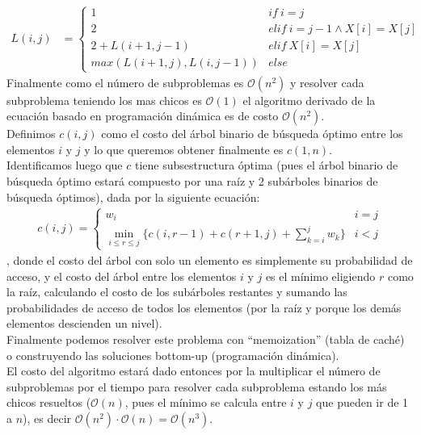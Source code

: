 \documentclass[dcc,uchile]{fcfmcourse}
\begin{document}
\begin{problems}
\begin{align*}
    L(i,j) &= 
    \begin{cases} 
      1 & if\ i = j \\
      2 & elif\ i = j-1 \land X[i]=X[j]\\
      2+L(i+1,j-1) & elif\ X[i]=X[j]\\
      max(L(i+1,j), L(i,j-1))& else
   \end{cases}
\end{align*}
Finalmente como el número de subproblemas es $\mathcal{O}(n^2)$ y resolver cada subproblema teniendo los mas chicos es $\mathcal{O}(1)$ el algoritmo derivado de la ecuación basado en programación dinámica es de costo $\mathcal{O}(n^2)$.
\\
Definimos $c(i,j)$ como el costo del árbol binario de búsqueda óptimo entre los elementos $i$ y $j$ y lo que queremos obtener finalmente es $c(1,n)$.\\

Identificamos luego que $c$ tiene subsestructura óptima (pues el árbol binario de búsqueda óptimo estará compuesto por una raíz y 2 subárboles binarios de búsqueda óptimos), dada por la siguiente ecuación:
\begin{align*}
    c(i,j) =  \begin{cases} 
      w_{i} & i = j\\
      \min_{i\le r\le j}\{c(i,r-1)+c(r+1,j) + \sum_{k=i}^j w_{k}\} & i < j
   \end{cases}
\end{align*}
, donde el costo del árbol con solo un elemento es simplemente su probabilidad de acceso, y el costo del árbol entre los elementos $i$ y $j$ es el mínimo eligiendo $r$ como la raíz, calculando el costo de los subárboles restantes y sumando las probabilidades de acceso de todos los elementos (por la raíz y porque los demás elementos descienden un nivel).\\

Finalmente podemos resolver este problema con ``memoization'' (tabla de caché) o construyendo las soluciones bottom-up (programación dinámica).\\
El costo del algoritmo estará dado entonces por la multiplicar el número de subproblemas por el tiempo para resolver cada subproblema estando los más chicos resueltos ($\mathcal{O}(n)$, pues el mínimo se calcula entre $i$ y $j$ que pueden ir de 1 a $n$), es decir $\mathcal{O}(n^2) \cdot \mathcal{O}(n) = \mathcal{O}(n^3)$.
\end{problems}
\end{document}
